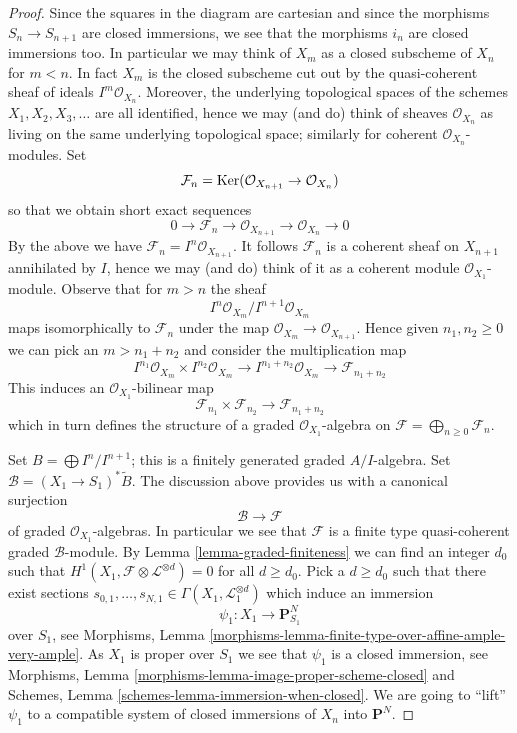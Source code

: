 \begin{proof}
Since the squares in the diagram are cartesian and since the morphisms
$S_n \to S_{n + 1}$ are closed immersions, we see that the morphisms
$i_n$ are closed immersions too. In particular we may think of
$X_m$ as a closed subscheme of $X_n$ for $m < n$. In fact $X_m$ is
the closed subscheme cut out by the quasi-coherent sheaf of ideals
$I^m\mathcal{O}_{X_n}$. Moreover, the underlying topological spaces
of the schemes $X_1, X_2, X_3, \ldots$ are all identified, hence we
may (and do) think of sheaves $\mathcal{O}_{X_n}$ as living on the
same underlying topological space; similarly for coherent
$\mathcal{O}_{X_n}$-modules. Set
$$
\mathcal{F}_n =
\mathop{\mathrm{Ker}}(\mathcal{O}_{X_{n + 1}} \to \mathcal{O}_{X_n})
$$
so that we obtain short exact sequences
$$
0 \to \mathcal{F}_n \to \mathcal{O}_{X_{n + 1}} \to \mathcal{O}_{X_n} \to 0
$$
By the above we have $\mathcal{F}_n = I^n\mathcal{O}_{X_{n + 1}}$.
It follows $\mathcal{F}_n$ is a coherent sheaf on $X_{n + 1}$
annihilated by $I$, hence we may (and do) think of it as a coherent
module $\mathcal{O}_{X_1}$-module. Observe that for $m > n$ the sheaf
$$
I^n\mathcal{O}_{X_m}/I^{n + 1}\mathcal{O}_{X_m}
$$
maps isomorphically to $\mathcal{F}_n$ under the map
$\mathcal{O}_{X_m} \to \mathcal{O}_{X_{n + 1}}$. Hence given
$n_1, n_2 \geq 0$ we can pick an $m > n_1 + n_2$ and consider the
multiplication map
$$
I^{n_1}\mathcal{O}_{X_m} \times I^{n_2}\mathcal{O}_{X_m}
\longrightarrow
I^{n_1 + n_2}\mathcal{O}_{X_m} \to \mathcal{F}_{n_1 + n_2}
$$
This induces an $\mathcal{O}_{X_1}$-bilinear map
$$
\mathcal{F}_{n_1} \times \mathcal{F}_{n_2} \longrightarrow
\mathcal{F}_{n_1 + n_2}
$$
which in turn defines the structure of a graded $\mathcal{O}_{X_1}$-algebra
on $\mathcal{F} = \bigoplus_{n \geq 0} \mathcal{F}_n$.

\medskip\noindent
Set $B = \bigoplus I^n/I^{n + 1}$; this is a finitely generated
graded $A/I$-algebra. Set $\mathcal{B} = (X_1 \to S_1)^*\widetilde{B}$.
The discussion above provides us with a canonical surjection
$$
\mathcal{B} \longrightarrow \mathcal{F}
$$
of graded $\mathcal{O}_{X_1}$-algebras. In particular we see that
$\mathcal{F}$ is a finite type quasi-coherent graded $\mathcal{B}$-module.
By Lemma \ref{lemma-graded-finiteness} we can find an integer $d_0$
such that $H^1(X_1, \mathcal{F} \otimes \mathcal{L}^{\otimes d}) = 0$
for all $d \geq d_0$. Pick a $d \geq d_0$ such that there exist sections
$s_{0, 1}, \ldots, s_{N, 1} \in \Gamma(X_1, \mathcal{L}_1^{\otimes d})$
which induce an immersion
$$
\psi_1 : X_1 \to \mathbf{P}^N_{S_1}
$$
over $S_1$, see
Morphisms, Lemma \ref{morphisms-lemma-finite-type-over-affine-ample-very-ample}.
As $X_1$ is proper over $S_1$ we see that $\psi_1$
is a closed immersion, see
Morphisms, Lemma \ref{morphisms-lemma-image-proper-scheme-closed}
and
Schemes, Lemma \ref{schemes-lemma-immersion-when-closed}.
We are going to ``lift'' $\psi_1$ to a compatible system of
closed immersions of $X_n$ into $\mathbf{P}^N$.


\end{proof}

